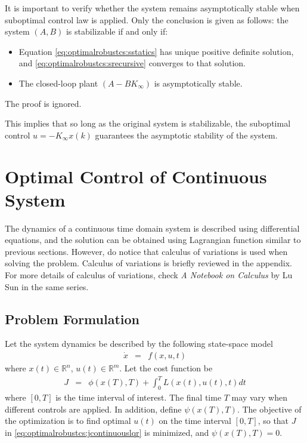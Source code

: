 It is important to verify whether the system remains asymptotically stable when suboptimal control law is applied. Only the conclusion is given as follows: the system $(A,B)$ is stabilizable if and only if:
\begin{itemize}
	\item Equation \eqref{eq:optimalrobustcs:sstatics} has unique positive definite solution, and \eqref{eq:optimalrobustcs:srecursive} converges to that solution.
	\item The closed-loop plant $(A-BK_\infty)$ is asymptotically stable.
\end{itemize} 
The proof is ignored.

This implies that so long as the original system is stabilizable, the suboptimal control $u=-K_\infty x(k)$ guarantees the asymptotic stability of the system.

\section{Optimal Control of Continuous System}

The dynamics of a continuous time domain system is described using differential equations, and the solution can be obtained using Lagrangian function similar to previous sections. However, do notice that calculus of variations is used when solving the problem. Calculus of variations is briefly reviewed in the appendix. For more details of calculus of variations, check \textit{A Notebook on Calculus} by Lu Sun in the same series.

\subsection{Problem Formulation}

Let the system dynamics be described by the following state-space model
\begin{eqnarray}
	\dot{x} &=& f(x, u, t) \nonumber
\end{eqnarray}
where $x(t)\in \mathbb{R}^n$, $u(t)\in\mathbb{R}^m$. Let the cost function be
\begin{eqnarray}
	J &=& \phi\left(x(T), T\right) + \int_{0}^{T} L\left(x(t), u(t), t\right)dt \label{eq:optimalrobustcs:jcontinuouslqr}
\end{eqnarray}
where $[0, T]$ is the time interval of interest. The final time $T$ may vary when different controls are applied. In addition, define $\psi\left(x(T), T\right)$. The objective of the optimization is to find optimal $u(t)$ on the time interval $[0, T]$, so that $J$ in \eqref{eq:optimalrobustcs:jcontinuouslqr} is minimized, and $\psi\left(x(T), T\right) = 0$. 

